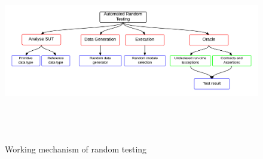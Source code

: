 \begin{figure}[h]
	\centering
	\centerline{\includegraphics[width=16.5cm, height=8cm ]{chapter2/randomTestingMechanism.png}}
	\caption{Working mechanism of random testing}
\end{figure}

